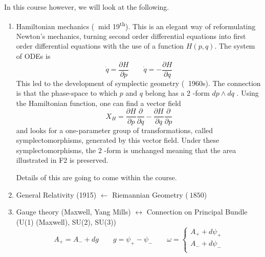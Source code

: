 In this course however, we will look at the following.
\begin{enumerate}[1)]
  \item Hamiltonian mechanics ($~$ mid 19\textsuperscript{th}). This is an elegant way of reformulating Newton's mechanics, turning second order differential equations into first order differential equations with the use of a function $H(p, q)$. The system of ODEs is 
    \begin{equation}
      \dot{q} = \frac{\partial H}{\partial p} \qquad \dot{q} = - \frac{\partial H}{\partial q}
    \end{equation}
    This led to the development of symplectic geometry ($~$ 1960s).
    The connection is that the phase-space to which $p$  and $q$  belong has a $2$ -form $dp \wedge dq$ .
    Using the Hamiltonian function, one can find a vector field 
    \begin{equation}
      X_H = \frac{\partial H}{\partial p} \frac{\partial }{\partial q} - \frac{\partial H}{\partial q} \frac{\partial }{\partial p}
    \end{equation}
    and looks for a one-parameter group of transformations, called symplectomorphisms, generated by this vector field. Under these symplectomorphisms, the $2$ -form is unchanged meaning that the area illustrated in F2 is preserved.
    \begin{figure}[tbhp]
      \centering
      \def\svgwidth{0.4\columnwidth}
      
      \caption{}
      \label{fig:l1f2}
    \end{figure}
    Details of this are going to come within the course.
  \item General Relativity (1915) $\leftarrow$  Riemannian Geometry ($~1850$)
  \item Gauge theory (Maxwell, Yang Mills) $\leftrightarrow$  Connection on Principal Bundle (U(1) (Maxwell), SU(2), SU(3))
    \begin{equation}
      A_+ = A_- + d g \qquad g = \psi_+ - \psi_- \qquad 
      \omega = \left\{ 
	\begin{matrix}
	A_+ + d\psi_+ \\
	A_- + d\psi_- \\
	\end{matrix}
      \right.
    \end{equation}
    \begin{figure}[tbhp]
      \centering
      \def\svgwidth{0.4\columnwidth}
      
      \caption{}
      \label{fig:l1f3}
    \end{figure}
\end{enumerate}

